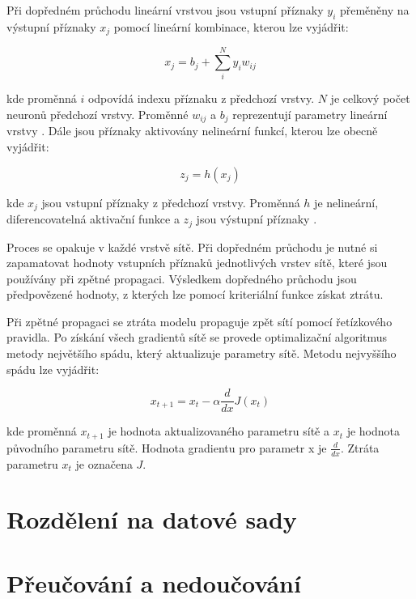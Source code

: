\documentclass[FM,BP]{tulthesis}
\begin{document}
Při dopředném průchodu lineární vrstvou jsou vstupní příznaky $ y_i $ přeměněny na výstupní příznaky $ x_j $ pomocí lineární kombinace, kterou lze vyjádřit:

\begin{equation}
\label{eqn:linear_layer}
x_j = b_j + \sum_{i}^{N} y_i w_{ij}
\end{equation}

kde proměnná $ i $ odpovídá indexu příznaku z předchozí vrstvy. $ N $ je celkový počet neuronů předchozí vrstvy. Proměnné $ w_{ij} $ a $ b_j $ reprezentují parametry lineární vrstvy \cite{MATEJU2021327}. Dále jsou příznaky aktivovány nelineární funkcí, kterou lze obecně vyjádřit:

\begin{equation}
\label{eqn:activation}
z_j = h(x_j)
\end{equation}

kde $ x_j $ jsou vstupní příznaky z předchozí vrstvy. Proměnná $ h $ je nelineární, diferencovatelná aktivační funkce a $ z_j $ jsou výstupní příznaky \cite{DBLP:books/lib/Bishop07}.

Proces se opakuje v každé vrstvě sítě. Při dopředném průchodu je nutné si zapamatovat hodnoty vstupních příznaků jednotlivých vrstev sítě, které jsou používány při zpětné propagaci. Výsledkem dopředného průchodu jsou předpovězené hodnoty, z kterých lze pomocí kriteriální funkce získat ztrátu.

Při zpětné propagaci se ztráta modelu propaguje zpět sítí pomocí řetízkového pravidla. Po získání všech gradientů sítě se provede optimalizační algoritmus metody největšího spádu, který aktualizuje parametry sítě. Metodu nejvyššího spádu lze vyjádřit:

\begin{equation}
\label{eqn:gradient_descent}
x_{t+1} = x_t - \alpha \frac{d}{dx}J(x_t)
\end{equation}

kde proměnná $ x_{t+1} $ je hodnota aktualizovaného parametru sítě a $ x_t $ je hodnota původního parametru sítě. Hodnota gradientu pro parametr x je $ \frac{d}{dx} $. Ztráta parametru $ x_t $ je označena $ J $.

\section{Rozdělení na datové sady}
\section{Přeučování a nedoučování}
\end{document}
